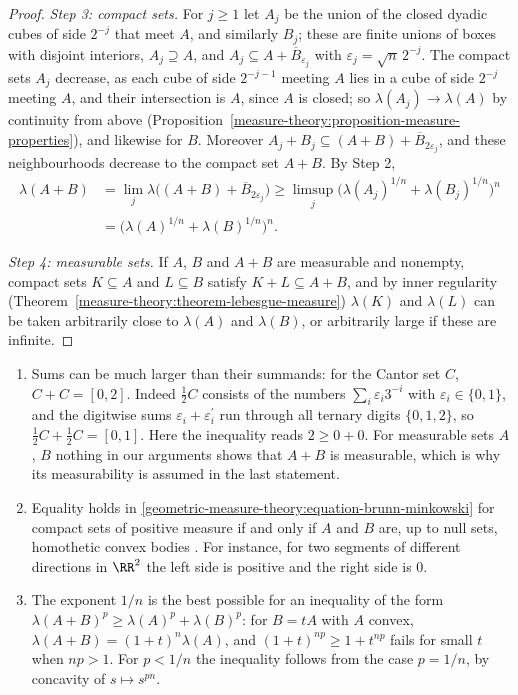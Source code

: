 \begin{proof}
\emph{Step 3: compact sets.} For $j \geq 1$ let $A_j$ be the union of the closed dyadic cubes of side $2^{-j}$ that meet $A$, and similarly $B_j$; these are finite unions of boxes with disjoint
interiors, $A_j \supseteq A$, and $A_j \subseteq A + \overline{B}_{\varepsilon_j}$ with $\varepsilon_j = \sqrt n\,2^{-j}$. The compact sets $A_j$ decrease, as each cube of side $2^{-j-1}$ meeting $A$ lies in a
cube of side $2^{-j}$ meeting $A$, and their intersection is $A$, since $A$ is closed; so $\lambda(A_j) \to \lambda(A)$ by continuity from above
(Proposition~\ref{measure-theory:proposition-measure-properties}), and likewise for $B$. Moreover $A_j + B_j \subseteq (A + B) + \overline{B}_{2\varepsilon_j}$, and these neighbourhoods decrease to the compact set
$A + B$. By Step 2,
\[\begin{aligned}
\lambda(A + B) &= \lim_j\lambda\bigl((A + B) + \overline{B}_{2\varepsilon_j}\bigr) \geq \limsup_j\bigl(\lambda(A_j)^{1/n} + \lambda(B_j)^{1/n}\bigr)^n \\
&= \bigl(\lambda(A)^{1/n} + \lambda(B)^{1/n}\bigr)^n.
\end{aligned}\]

\emph{Step 4: measurable sets.} If $A$, $B$ and $A + B$ are measurable and nonempty, compact sets $K \subseteq A$ and $L \subseteq B$ satisfy $K + L \subseteq A + B$, and by inner regularity
(Theorem~\ref{measure-theory:theorem-lebesgue-measure}) $\lambda(K)$ and $\lambda(L)$ can be taken arbitrarily close to $\lambda(A)$ and $\lambda(B)$, or arbitrarily large if these are infinite.
\end{proof}

\begin{remark}\label{geometric-measure-theory:remark-brunn-minkowski}
\begin{enumerate}
\item Sums can be much larger than their summands: for the Cantor set $C$, $C + C = [0, 2]$. Indeed $\frac12C$ consists of the numbers $\sum_i\varepsilon_i3^{-i}$ with $\varepsilon_i \in \{0, 1\}$,
and the digitwise sums $\varepsilon_i + \varepsilon_i^{\prime}$ run through all ternary digits $\{0, 1, 2\}$, so $\frac12C + \frac12C = [0, 1]$. Here the inequality reads $2 \geq 0 + 0$. For measurable sets
$A$, $B$ nothing in our arguments shows that $A + B$ is measurable, which is why its measurability is assumed in the last statement.
\item Equality holds in \eqref{geometric-measure-theory:equation-brunn-minkowski} for compact sets of positive measure if and only if $A$ and $B$ are, up to null sets, homothetic convex bodies \cite{gardner-2002}.
For instance, for two segments of different directions in $\RR^2$ the left side is positive and the right side is $0$.
\item The exponent $1/n$ is the best possible for an inequality of the form $\lambda(A + B)^p \geq \lambda(A)^p + \lambda(B)^p$: for $B = tA$ with $A$ convex, $\lambda(A + B) = (1 + t)^n\lambda(A)$, and
$(1 + t)^{np} \geq 1 + t^{np}$ fails for small $t$ when $np > 1$. For $p < 1/n$ the inequality follows from the case $p = 1/n$, by concavity of $s \mapsto s^{pn}$.
\end{enumerate}
\end{remark}

